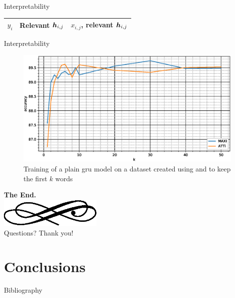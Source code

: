 \begin{frame}{Interpretability}
  \centering
  \tiny
    \begin{tabular}{|c|c|c|}
    \hline
    $y_i$&\textrm{Relevant} $\bm{h}_{i,j}$&$x_{i,j}$\textrm{, relevant} $\bm{h}_{i,j}$\\
    \hline
    
    \hline
    
    \hline
    
    \hline
  \end{tabular}
\end{frame}

\begin{frame}{Interpretability}
  \begin{figure}
  \centering
  \includegraphics[width=\textwidth]{img/plotSintex.eps}
  \caption{Training of a plain \ac{gru} model on a dataset created
    using \maxi{} and \softmaxi{} to keep the first $k$ words}
\end{figure}
\end{frame}

\begin{frame}
  \begin{center}
    \textbf{\calligra\Huge The End.}\\
    \includegraphics[width=5cm]{img/ornament.eps}\\[1cm]
    {\huge\calligra Questions? Thank you!}
  \end{center}
\end{frame}

\section{Conclusions}


\backupbegin

\begin{frame}[allowframebreaks]{Bibliography}
  \scriptsize
  
\end{frame}


\backupend



